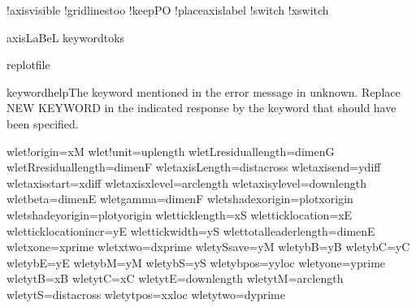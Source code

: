 \newif\if!axisvisible           %
\newif\if!gridlinestoo          %
\newif\if!keepPO                %
\newif\if!placeaxislabel        %
\newif\if!switch                %
\newif\if!xswitch               %

\newtoks\!axisLaBeL             %
\newtoks\!keywordtoks           %

\newwrite\!replotfile           %

\newhelp\!keywordhelp{The keyword mentioned in the error message in unknown. 
Replace NEW KEYWORD in the indicated response by the keyword that 
should have been specified.}    %

\!wlet\!!origin=\!xM                   %
\!wlet\!!unit=\!uplength               %
\!wlet\!Lresiduallength=\!dimenG       %
\!wlet\!Rresiduallength=\!dimenF       %
\!wlet\!axisLength=\!distacross        %
\!wlet\!axisend=\!ydiff                %
\!wlet\!axisstart=\!xdiff              %
\!wlet\!axisxlevel=\!arclength         %
\!wlet\!axisylevel=\!downlength        %
\!wlet\!beta=\!dimenE                  %
\!wlet\!gamma=\!dimenF                 %
\!wlet\!shadexorigin=\!plotxorigin     %
\!wlet\!shadeyorigin=\!plotyorigin     %
\!wlet\!ticklength=\!xS                %
\!wlet\!ticklocation=\!xE              %
\!wlet\!ticklocationincr=\!yE          %
\!wlet\!tickwidth=\!yS                 %
\!wlet\!totalleaderlength=\!dimenE     %
\!wlet\!xone=\!xprime                  %
\!wlet\!xtwo=\!dxprime                 %
\!wlet\!ySsave=\!yM                    %
\!wlet\!ybB=\!yB                       %
\!wlet\!ybC=\!yC                       %
\!wlet\!ybE=\!yE                       %
\!wlet\!ybM=\!yM                       %
\!wlet\!ybS=\!yS                       %
\!wlet\!ybpos=\!yyloc                  %
\!wlet\!yone=\!yprime                  %
\!wlet\!ytB=\!xB                       %
\!wlet\!ytC=\!xC                       %
\!wlet\!ytE=\!downlength               %
\!wlet\!ytM=\!arclength                %
\!wlet\!ytS=\!distacross               %
\!wlet\!ytpos=\!xxloc                  %
\!wlet\!ytwo=\!dyprime                 %


